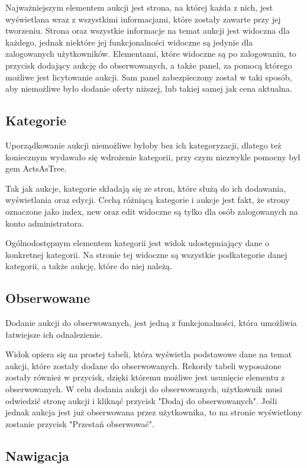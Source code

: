 \documentclass[brudnopis]{xmgr}
\begin{document}
Najważniejszym elementem aukcji jest strona, na której każda z nich, jest wyświetlana wraz z wszystkimi informacjami, które zostały zawarte przy jej tworzeniu. Strona oraz wszystkie informacje na temat aukcji jest widoczna dla każdego, jednak niektóre jej funkcjonalności widoczne są jedynie dla zalogowanych użytkowników. Elementami, które widoczne są po zalogowaniu, to przycisk dodający aukcję do obserwowanych, a także panel, za pomocą którego możliwe jest licytowanie aukcji. Sam panel zabezpieczony został w taki sposób, aby niemożliwe było dodanie oferty niższej, lub takiej samej jak cena aktualna.

\subsection{Kategorie}

Uporządkowanie aukcji niemożliwe byłoby bez ich kategoryzacji, dlatego też koniecznym wydawało się wdrożenie kategorii, przy czym niezwykle pomocny był gem ActsAsTree.

Tak jak aukcje, kategorie składają się ze stron, które służą do ich dodawania, wyświetlania oraz edycji. Cechą różniącą kategorie i aukcje jest fakt, że strony oznaczone jako index, new oraz edit widoczne są tylko dla osób zalogowanych na konto administratora.

Ogólnodostępnym elementem kategorii jest widok udostępniający dane o konkretnej kategorii. Na stronie tej widoczne są wszystkie podkategorie danej kategorii, a także aukcję, które do niej należą.

\subsection{Obserwowane}

Dodanie aukcji do obserwowanych, jest jedną z funkcjonalności, która umożliwia łatwiejsze ich odnalezienie.

Widok opiera się na prostej tabeli, która wyświetla podstawowe dane na temat aukcji, które zostały dodane do obserwowanych. Rekordy tabeli wyposażone zostały również w przycisk, dzięki któremu możliwe jest usunięcie elementu z obserwowanych. W celu dodania aukcji do obserwowanych, użytkownik musi odwiedzić stronę aukcji i kliknąć przycisk "Dodaj do obserwowanych". Jeśli jednak aukcja jest już obserwowana przez użytkownika, to na stronie wyświetlony zostanie przycisk "Przestań obserwować".

\subsection{Nawigacja}
\end{document}
